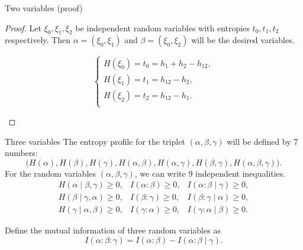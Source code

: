 \documentclass[aspectratio=169]{beamer}
\begin{document}
    \begin{frame}{Two variables (proof)}
		\begin{proof}
		    Let \(\xi_0, \xi_1, \xi_2\) be independent random variables with entropies \(t_0, t_1, t_2\) respectively. Then \(\alpha = (\xi_0, \xi_1)\) and \(\beta = (\xi_0, \xi_2)\) will be the desired variables.\bigskip

		    \begin{center} \mbox{}\hfill
		    \parbox{.4\textwidth}{\centering{}}\hfill
		    	\parbox{.5\textwidth}{
		            \[
		            \begin{cases}
		                H(\xi_0) = t_0 = h_1 + h_2 - h_{12},\\
		                H(\xi_1) = t_1 = h_{12} - h_{2},\\
		                H(\xi_2) = t_2 = h_{12} - h_{1}.\\
		            \end{cases}
		            \]\qedhere}
		    \end{center}
		\end{proof}
    \end{frame}

    \begin{frame}{Three variables}
		The entropy profile for the triplet \((\alpha, \beta, \gamma)\) will be defined by 7 numbers:
		\[
		\bigl(H(\alpha), H(\beta), H(\gamma), H(\alpha, \beta), H(\alpha, \gamma),
		H(\beta, \gamma), H(\alpha, \beta, \gamma)\bigr).
		\]
		For the random variables \((\alpha, \beta, \gamma)\), we can write 9 independent inequalities.
		\begin{equation*}
		\begin{array}{lll}
		H(\alpha \mid \beta, \gamma) \ge 0, & I(\alpha : \beta) \ge 0, & I(\alpha : \beta \mid \gamma) \ge 0,\\
		H(\beta \mid \gamma, \alpha) \ge 0, & I(\beta : \gamma) \ge 0, & I(\beta : \gamma \mid \alpha) \ge 0,\\
		H(\gamma \mid \alpha, \beta) \ge 0, & I(\gamma : \alpha) \ge 0, & I(\gamma : \alpha \mid \beta) \ge 0.
		\end{array}
		\end{equation*}
		\begin{definition}
		Define the mutual information of three random variables as
		\[
		    I(\alpha : \beta : \gamma) = I(\alpha : \beta) - I(\alpha : \beta \mid \gamma).
		\]
		\end{definition}
    \end{frame}
\end{document}
